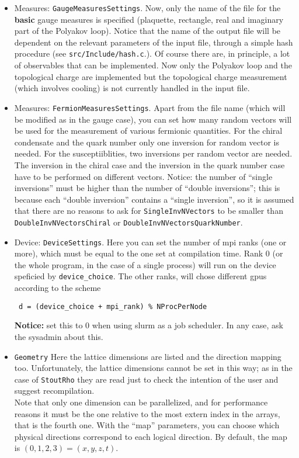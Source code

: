 \begin{itemize}
\item{Measures: \verb|GaugeMeasuresSettings|.} Now, only the name of the file
for the {\bf basic} gauge measures is specified (plaquette, rectangle, real and imaginary part of the Polyakov loop). Notice that the name of the output 
file will be dependent on the relevant parameters of the input file, through a
simple hash procedure (see \verb|src/Include/hash.c|.). Of course there are, in principle, a lot of observables that can be implemented. Now only the Polyakov
loop and the topological charge are implemented but the topological charge 
measurement (which involves cooling) is not currently handled in the input file. 
\item{Measures: \verb|FermionMeasuresSettings|.}
 Apart from the file name (which will be modified as in the gauge case),   
you can set how many random vectors will be used for the measurement of various 
fermionic quantities. For the chiral condensate and the quark number only one 
inversion for random vector is needed. For the susceptiiblities, two inversions 
per random vector are needed. The inversion in the chiral case and the inversion 
in the quark number case have to be performed on different vectors. Notice: the 
number of ``single inversions'' must be higher than the number of ``double 
inversions''; this is because each ``double inversion'' 
contains a ``single inversion'', so it is assumed that there are no reasons to 
ask for \verb|SingleInvNVectors| to be smaller than \verb|DoubleInvNVectorsChiral|
or \verb|DoubleInvNVectorsQuarkNumber|.
    
\item{Device: \verb|DeviceSettings|.}  Here you can set the number of 
mpi ranks (one or more), which must be equal to  the one set at compilation 
time. Rank 0 (or the whole program, in the case of a single process) will run 
on the device speficied by \verb|device_choice|. The other ranks, will chose 
different gpus according to the scheme
\begin{verbatim}
 d = (device_choice + mpi_rank) % NProcPerNode
\end{verbatim}
\textbf{Notice: } set this to 0 when using slurm as a job scheduler. In any 
case, ask the sysadmin about this.\\


\item{\verb|Geometry|} Here the lattice dimensions are listed and the 
direction mapping too. Unfortunately, the lattice dimensions cannot be set in 
this way; as in the case of \verb|StoutRho| they are read just to check the 
intention of the user and suggest recompilation. \\
Note that only one dimension can be parallelized, and for performance 
reasons it must be the one relative to the most extern index in the arrays, 
that is the fourth one. With the ``map'' parameters, you can choose which 
physical directions correspond to each logical direction. By default, 
the map is $(0,1,2,3) = (x,y,z,t)$.


\end{itemize}
